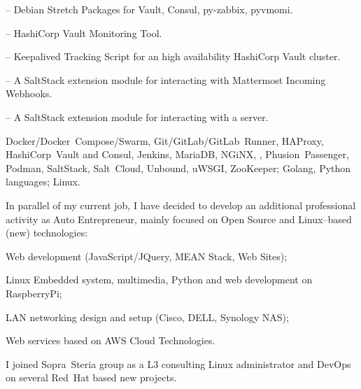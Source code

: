 \smallskip\noindent
\software
{} --
Debian Stretch Packages for Vault, Consul, py-zabbix, pyvmomi.

\noindent
{} --
HashiCorp Vault Monitoring Tool.

\noindent
{} --
Keepalived Tracking Script for an high availability HashiCorp Vault cluster.

\noindent
{} --
A SaltStack extension module for interacting with Mattermost Incoming Webhooks.

\noindent
{} --
A SaltStack extension module for interacting with a \phpIPAM{} server.


\smallskip\noindent
\technologies
Docker/Docker~Compose/Swarm, Git/GitLab/GitLab~Runner, HAProxy,
HashiCorp~Vault and Consul, Jenkins, MariaDB, NGiNX, \phpIPAM,
Phusion~Passenger, Podman, SaltStack, Salt~Cloud, Unbound, uWSGI, ZooKeeper;
Golang, Python languages; Linux.



In parallel of my current job, I have decided to develop an additional professional
activity as Auto Entrepreneur, mainly focused on Open Source and Linux--based (new) technologies:

\item{\bdot} Web development (JavaScript/JQuery, MEAN Stack, Web Sites);
\item{\bdot} Linux Embedded system, multimedia, Python and web development on RaspberryPi;
\item{\bdot} LAN networking design and setup (Cisco, DELL, Synology NAS);
\item{\bdot} Web services based on AWS Cloud Technologies.



I joined Sopra~Steria group as a L3 consulting Linux administrator and DevOps on
several Red~Hat based new projects.

